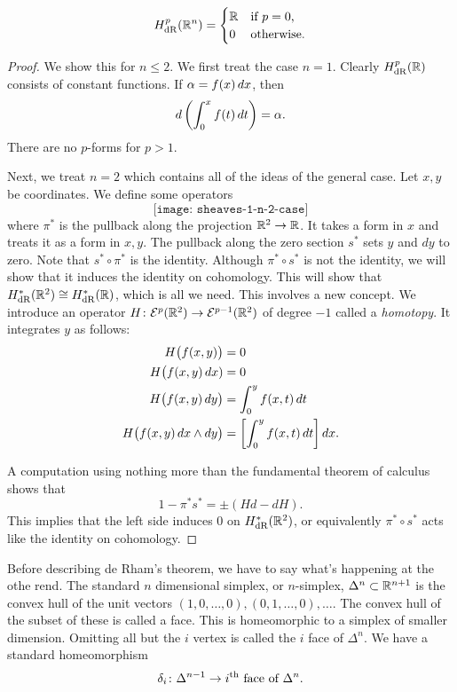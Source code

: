 \begin{theorem}
  \[
    H_{\mathrm{dR}}^p(\mathbb{R}^n)=
    \begin{cases}
      \mathbb{R}&\text{if \(p=0\),}\\
      0&\text{otherwise}.
    \end{cases}
  \]
\end{theorem}
\begin{proof}
  We show this for \(n\leq 2\). We first treat the case \(n=1\). Clearly
  \(H_{\mathrm{dR}}^p(\mathbb{R})\) consists of constant functions. If \(\alpha=f(x)\mathop{}\!d
  x\), then
  \[
    d\left(\int_0^x f(t)\mathop{}\!d t\right)=\alpha.
  \]
  There are no \(p\)-forms for \(p>1\).

  Next, we treat \(n=2\) which contains all of the ideas of the general
  case. Let \(x,y\) be coordinates. We define some operators
  \[
    \texttt{[image: sheaves-1-n-2-case]}
  \]
  where \(\pi^*\) is the pullback along the projection
  \(\mathbb{R}^2\to\mathbb{R}\). It takes a form in \(x\) and treats it as a form in
  \(x,y\). The pullback along the zero section \(s^*\) sets \(y\) and
  \(dy\) to zero. Note that \(s^*\circ\pi^*\) is the identity. Although
  \(\pi^*\circ s^*\) is not the identity, we will show that it induces the
  identity on cohomology. This will show that \(H_{\mathrm{dR}}^*(\mathbb{R}^2)\cong
  H_{\mathrm{dR}}^*(\mathbb{R})\), which is all we need. This involves a new concept. We
  introduce an operator \(H\colon\mathcal{E}^p(\mathbb{R}^2)\to\mathcal{E}^{p-1}(\mathbb{R}^2)\) of
  degree \(-1\) called a \emph{homotopy}. It integrates \(y\) as follows:
  \begin{align*}
    H\bigl(f(x,y)\bigr)&=0\\
    H\bigl(f(x,y)\mathop{}\!d x)&=0\\
    H\bigl(f(x,y)\mathop{}\!d y\bigr)
                       &=\int_0^y f(x,t)\mathop{}\!d t\\
    H\bigl(f(x,y)\mathop{}\!d x\wedge dy\bigr)
    &=\left[\int_0^y f(x,t)\mathop{}\!d t\right]dx.
  \end{align*}

  A computation using nothing more than the fundamental theorem of calculus
  shows that
  \[
    1-\pi^*s^*=\pm(Hd-dH).
  \]
  This implies that the left side induces \(0\) on \(H^*_{\mathrm{dR}}(\mathbb{R}^2)\),
  or equivalently \(\pi^*\circ s^*\) acts like the identity on
  cohomology.
\end{proof}

Before describing de Rham's theorem, we have to say what's happening at the
othe rend. The standard \(n\) dimensional simplex, or \(n\)-simplex,
\(\Delta^n\subset\mathbb{R}^{n+1}\) is the convex hull of the unit vectors
\((1,0,\dotsc,0),(0,1,\dotsc,0),\dotsc\). The convex hull of the subset of
these is called a face. This is homeomorphic to a simplex of smaller
dimension. Omitting all but the \(i\) vertex is called the
\(i\) face of \(\Delta^n\). We have a standard homeomorphism
\[
  \delta_i\colon\Delta^{n-1}\to\text{\(i\)\textsuperscript{th} face of \(\Delta^n\)}.
\]

